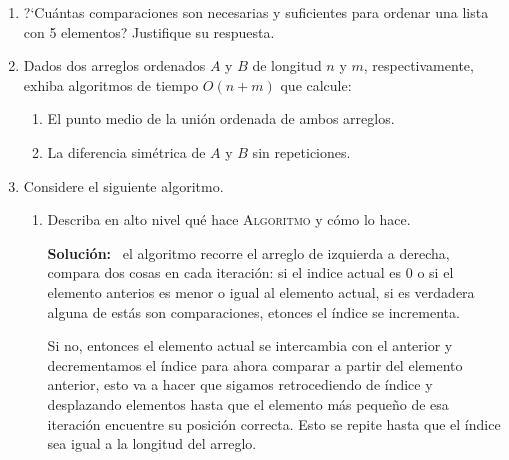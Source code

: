 \documentclass{article}
\newcommand{\Sol}{\textbf{Soluci\'on:} \ }
\begin{document}
\begin{enumerate}
    \item ?`Cu\'antas comparaciones son necesarias y suficientes para ordenar
        una lista con 5 elementos?   Justifique su respuesta.

    \item Dados dos arreglos ordenados $A$ y $B$ de longitud $n$ y $m$,
        respectivamente, exhiba algoritmos de tiempo $O(n+m)$ que calcule:
        \begin{enumerate}
            \item El punto medio de la uni\'on ordenada de ambos arreglos.
            \item La diferencia sim\'etrica de $A$ y $B$ sin repeticiones.
        \end{enumerate}

    \item Considere el siguiente algoritmo.
    
        \begin{minipage}[H]{0.943\textwidth}
        \begin{algorithm}[H]
            \DontPrintSemicolon
            \caption{\textsc{Algoritmo}}
        \end{algorithm}
        \end{minipage}
        \begin{enumerate}
            \item Describa en alto nivel qu\'e hace \textsc{Algoritmo} y c\'omo
                lo hace.
                
                \Sol el algoritmo recorre el arreglo de izquierda a derecha,
                compara dos cosas en cada iteración: si el indice actual es 0
                o si el elemento anterios es menor o igual al elemento actual, si es
                verdadera alguna de estás son comparaciones, etonces el índice se incrementa.

                Si no, entonces el elemento actual se intercambia con el
                anterior y decrementamos el índice para ahora comparar a partir del elemento anterior, esto
                va a hacer que sigamos retrocediendo de índice y desplazando elementos hasta que el elemento más pequeño de
                esa iteración encuentre su posición correcta.
                 Esto se repite hasta que el índice sea igual a la longitud del arreglo.


\end{enumerate}
\end{enumerate}
\end{document}
